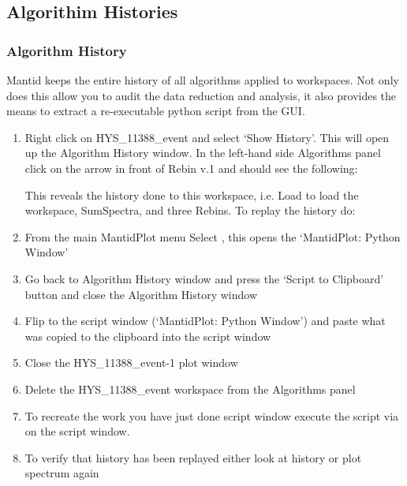 \documentclass[letterpaper,10pt,english,openany]{sphinxmanual}
\begin{document}
\subsection{Algorithim Histories}
\label{\detokenize{mantid_basic_course/algorithms_workspaces_and_histories/04_algorith_histories:algorithim-histories}}\label{\detokenize{mantid_basic_course/algorithms_workspaces_and_histories/04_algorith_histories:algorith-histories}}\label{\detokenize{mantid_basic_course/algorithms_workspaces_and_histories/04_algorith_histories::doc}}

\subsubsection{Algorithm History}
\label{\detokenize{mantid_basic_course/algorithms_workspaces_and_histories/04_algorith_histories:algorithm-history}}
Mantid keeps the entire history of all algorithms applied to workspaces.
Not only does this allow you to audit the data reduction and analysis,
it also provides the means to extract a re-executable python script from
the GUI.
\begin{enumerate}
\def\theenumi{\arabic{enumi}}
\def\labelenumi{\theenumi .}
\makeatletter\def\p@enumii{\p@enumi \theenumi .}\makeatother
\item {} 
Right click on HYS\_11388\_event and select ‘Show History’. This will
open up the Algorithm History window. In the left-hand side Algorithms
panel click on the arrow in front of Rebin v.1 and should see the
following:


This reveals the history done to this workspace, i.e. Load to load
the workspace, SumSpectra, and three Rebins.
To replay the history do:

\item {} 
From the main MantidPlot menu Select , this
opens the ‘MantidPlot: Python Window’

\item {} 
Go back to Algorithm History window and press the ‘Script to
Clipboard’ button and close the Algorithm History window

\item {} 
Flip to the script window (‘MantidPlot: Python Window’) and paste
what was copied to the clipboard into the script window

\item {} 
Close the HYS\_11388\_event-1 plot window

\item {} 
Delete the HYS\_11388\_event workspace from the Algorithms panel

\item {} 
To recreate the work you have just done script window execute the
script via  on the script window.

\item {} 
To verify that history has been replayed either look at history or
plot spectrum again

\end{enumerate}
\end{document}

